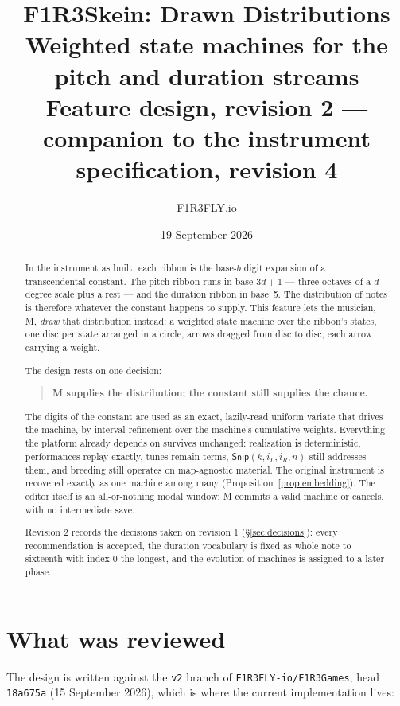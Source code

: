 \documentclass[11pt,a4paper]{article}
\title{\textbf{F1R3Skein: Drawn Distributions}\\[0.3em]
\large Weighted state machines for the pitch and duration streams\\[0.2em]
\normalsize Feature design, revision 2 --- companion to the instrument specification, revision 4}
\author{F1R3FLY.io}
\date{19 September 2026}
\theoremstyle{definition}
\theoremstyle{plain}
\theoremstyle{remark}
\begin{document}
\maketitle

\begin{abstract}
\noindent
In the instrument as built, each ribbon is the base-$b$ digit expansion of a transcendental
constant. The pitch ribbon runs in base $3d+1$ --- three octaves of a $d$-degree scale plus a rest
--- and the duration ribbon in base~5. The distribution of notes is therefore whatever the constant
happens to supply. This feature lets the musician, M, \emph{draw} that distribution instead: a
weighted state machine over the ribbon's states, one disc per state arranged in a circle, arrows
dragged from disc to disc, each arrow carrying a weight.

The design rests on one decision:
\begin{quote}
\textbf{M supplies the distribution; the constant still supplies the chance.}
\end{quote}
The digits of the constant are used as an exact, lazily-read uniform variate that drives the
machine, by interval refinement over the machine's cumulative weights. Everything the platform
already depends on survives unchanged: realisation is deterministic, performances replay exactly,
tunes remain terms, $\mathsf{Snip}(k,i_L,i_R,n)$ still addresses them, and breeding still operates
on map-agnostic material. The original instrument is recovered exactly as one machine among many
(Proposition~\ref{prop:embedding}). The editor itself is an all-or-nothing modal window: M commits
a valid machine or cancels, with no intermediate save.

Revision 2 records the decisions taken on revision 1 (\S\ref{sec:decisions}): every
recommendation is accepted, the duration vocabulary is fixed as whole note to sixteenth with index 0
the longest, and the evolution of machines is assigned to a later phase.
\end{abstract}

\tableofcontents

\section{What was reviewed}

The design is written against the \texttt{v2} branch of \texttt{F1R3FLY-io/F1R3Games}, head
\texttt{18a675a} (15 September 2026), which is where the current implementation lives:
\end{document}
